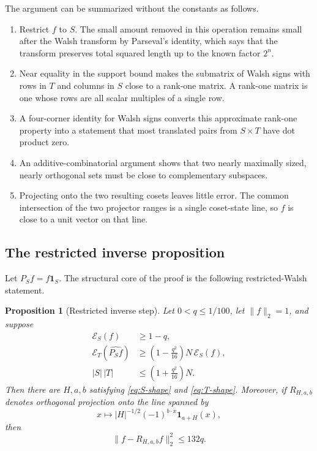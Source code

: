 \documentclass[11pt]{article}
\newtheorem{proposition}[theorem]{Proposition}
\theoremstyle{remark}
\newcommand{\E}{\mathcal E}
\newcommand{\1}{\mathbf 1}
\begin{document}
The argument can be summarized without the constants as follows.
\begin{enumerate}
  \item Restrict $f$ to $S$. The small amount removed in this operation
  remains small after the Walsh transform by Parseval's identity, which says
  that the transform preserves total squared length up to the known factor
  $2^n$.
  \item Near equality in the support bound makes the submatrix of Walsh
  signs with rows in $T$ and columns in $S$ close to a rank-one matrix. A
  rank-one matrix is one whose rows are all scalar multiples of a single
  row.
  \item A four-corner identity for Walsh signs converts this approximate
  rank-one property into a statement that most translated pairs from
  $S\times T$ have dot product zero.
  \item An additive-combinatorial argument shows that two nearly maximally
  sized, nearly orthogonal sets must be close to complementary subspaces.
  \item Projecting onto the two resulting cosets leaves little error. The
  common intersection of the two projector ranges is a single coset-state
  line, so $f$ is close to a unit vector on that line.
\end{enumerate}

\subsection{The restricted inverse proposition}

Let $P_S f=f\1_S$. The structural core of the proof is the following
restricted-Walsh statement.

\begin{proposition}[Restricted inverse step]\label{prop:restricted}
Let $0<q\leq1/100$, let $\|f\|_2=1$, and suppose
\begin{align}
  \E_S(f)&\geq1-q,\label{eq:restricted-primal}\\
  \E_T(\widehat{P_Sf})
    &\geq\left(1-\frac{q^2}{16}\right)N\,\E_S(f),
      \label{eq:restricted-fourier}\\
  |S|\,|T|&\leq\left(1+\frac{q^2}{16}\right)N.
      \label{eq:restricted-product}
\end{align}
Then there are $H,a,b$ satisfying
\eqref{eq:S-shape} and \eqref{eq:T-shape}. Moreover, if
$R_{H,a,b}$ denotes orthogonal projection onto the line spanned by
\[
  x\longmapsto |H|^{-1/2}(-1)^{b\cdot x}\1_{a+H}(x),
\]
then
\begin{equation}\label{eq:rank-one}
  \|f-R_{H,a,b}f\|_2^2\leq132q.
\end{equation}
\end{proposition}
\end{document}

